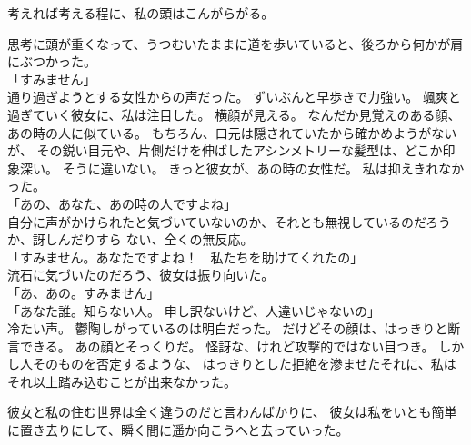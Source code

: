 \documentclass[../IHMain]{subfiles}
\begin{document}
考えれば考える程に、私の頭はこんがらがる。

思考に頭が重くなって、うつむいたままに道を歩いていると、後ろから何かが肩にぶつかった。\\
「すみません」\\
通り過ぎようとする女性からの声だった。
ずいぶんと早歩きで力強い。
颯爽と過ぎていく彼女に、私は注目した。
横顔が見える。
なんだか見覚えのある顔、あの時の人に似ている。
もちろん、口元は隠されていたから確かめようがないが、
その鋭い目元や、片側だけを伸ばしたアシンメトリーな髪型は、どこか印象深い。
そうに違いない。
きっと彼女が、あの時の女性だ。
私は抑えきれなかった。\\
「あの、あなた、あの時の人ですよね」\\
自分に声がかけられたと気づいていないのか、それとも無視しているのだろうか、訝しんだりすら
ない、全くの無反応。\\
「すみません。あなたですよね！　私たちを助けてくれたの」\\
流石に気づいたのだろう、彼女は振り向いた。\\
「あ、あの。すみません」\\
「あなた誰。知らない人。
申し訳ないけど、人違いじゃないの」\\
冷たい声。
鬱陶しがっているのは明白だった。
だけどその顔は、はっきりと断言できる。
あの顔とそっくりだ。
怪訝な、けれど攻撃的ではない目つき。
しかし人そのものを否定するような、
はっきりとした拒絶を滲ませたそれに、私はそれ以上踏み込むことが出来なかった。

彼女と私の住む世界は全く違うのだと言わんばかりに、
彼女は私をいとも簡単に置き去りにして、瞬く間に遥か向こうへと去っていった。
\end{document}

